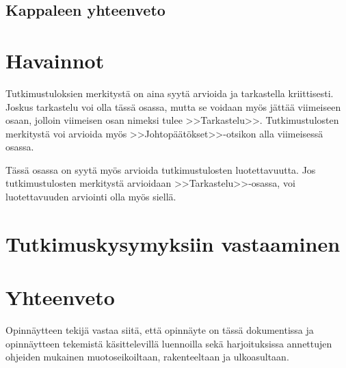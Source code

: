 \documentclass[finnish,12pt,a4paper,pdftex]{article}
\begin{document}
\subsection{Kappaleen yhteenveto}


\clearpage

\section{Havainnot}


Tutkimustuloksien merkitystä on aina syytä arvioida ja tarkastella
kriittisesti.  Joskus tarkastelu voi olla tässä osassa, mutta se
voidaan myös jättää viimeiseen osaan, jolloin viimeisen osan nimeksi
tulee >>Tarkastelu>>. Tutkimustulosten merkitystä voi arvioida myös
>>Johtopäätökset>>-otsikon alla viimeisessä osassa. 

Tässä osassa on syytä myös arvioida tutkimustulosten luotettavuutta.
Jos tutkimustulosten merkitystä arvioidaan >>Tarkastelu>>-osassa,
voi luotettavuuden arviointi olla myös siellä. 

\clearpage

\section{Tutkimuskysymyksiin vastaaminen}

\section{Yhteenveto}

Opinnäytteen tekijä vastaa siitä, että opinnäyte on tässä dokumentissa
ja opinnäytteen tekemistä käsittelevillä luennoilla sekä
harjoituksissa annettujen ohjeiden mukainen muotoseikoiltaan,
rakenteeltaan ja ulkoasultaan.



\clearpage
\end{document}
